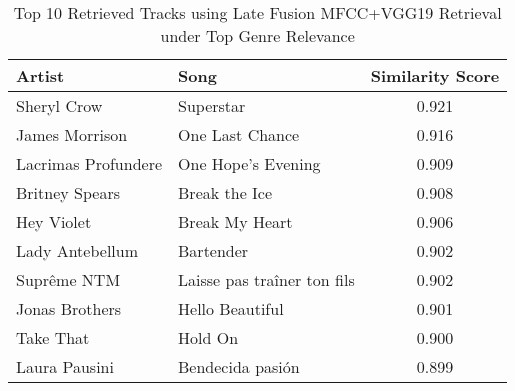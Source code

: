 \documentclass[sigconf]{acmart}
\begin{document}
\begin{table}[H]
    \centering
    \caption{Top 10 Retrieved Tracks using Late Fusion MFCC+VGG19 Retrieval under Top Genre Relevance}
    \label{tab:retrieved_late_fusion_top_genre_specific}
    \footnotesize
    \begin{tabular}{l l c}
        \toprule
        \textbf{Artist} & \textbf{Song} & \textbf{Similarity Score} \\
        \midrule
        Sheryl Crow & Superstar & 0.921 \\
        James Morrison & One Last Chance & 0.916 \\
        Lacrimas Profundere & One Hope's Evening & 0.909 \\
        Britney Spears & Break the Ice & 0.908 \\
        Hey Violet & Break My Heart & 0.906 \\
        Lady Antebellum & Bartender & 0.902 \\
        Suprême NTM & Laisse pas traîner ton fils & 0.902 \\
        Jonas Brothers & Hello Beautiful & 0.901 \\
        Take That & Hold On & 0.900 \\
        Laura Pausini & Bendecida pasión & 0.899 \\
        \bottomrule
    \end{tabular}
\end{table}


\newpage
\end{document}
